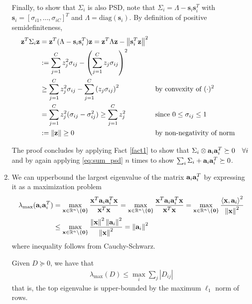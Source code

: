 \documentclass{article}
\begin{document}
\begin{enumerate}[label=1.I.\arabic*]
    Finally, to show that $\Sigma_i$ is also PSD, note that $\Sigma_i = \Lambda - \mathbf{s}_i \mathbf{s}_i^T $ with $\mathbf{s}_i =[\sigma_{i1},\dots, \sigma_{iC}]^T$ and $\Lambda=\text{diag}(\mathbf{s}_i)$. By definition of positive semidefiniteness,
    \begin{align}
        \zz^T \Sigma_i \zz &= \zz^T (\Lambda - \mathbf{s}_i \mathbf{s}_i^T)\zz = \zz^T \Lambda \zz - \norm{\mathbf{s}_i^T \zz}^2 \\
        &:= \sum_{j=1}^{C} z_j^2 \sigma_{ij} - \left(\sum_{j=1}^{C} z_j \sigma_{ij}\right)^2 \\
        &\geq \sum_{j=1}^{C} z_j^2 \sigma_{ij} - \sum_{j=1}^{C} \left( z_j \sigma_{ij}\right)^2 &&\text{by convexity of $(\cdot)^2$}\\
        &= \sum_{j=1}^{C} z_j^2 (\sigma_{ij} - \sigma_{ij}^2) \geq \sum_{j=1}^{C} z_j^2 &&\text{since $0\leq \sigma_{ij} \leq 1$}\\
        &:= \norm{\zz} \geq 0 &&\text{by non-negativity of norm}
    \end{align}
    
    The proof concludes by applying Fact \ref{fact1} to show that $\Sigma_i \otimes \aa_i \aa_i^T \succeq 0 \quad \forall i$ and by again applying \eqref{eq:sum_psd} $n$ times to show $\sum_i \Sigma_i + \aa_i \aa_i^T \succeq 0$.
    \item We can upperbound the largest eigenvalue of the matrix $\aa_i \aa_i^T$ by expressing it as a maximization problem
    \begin{align}
        \lambda_{\max} (\aa_i \aa_i^T) &= \max_{\xx \in \R^n\setminus\{\0\}} \frac{\xx^T \aa_i \aa_i^T \xx}{\xx^T \xx} = \max_{\xx \in \R^n\setminus\{\0\}}\frac{\xx^T \aa_i \aa_i^T \xx}{\xx^T \xx} = \max_{\xx \in \R^n\setminus\{\0\}}\frac{\lin{\xx, \aa_i}^2}{\norm{\xx}^2} \\
        &\leq \max_{\xx \in \R^n\setminus\{\0\}} \frac{\norm{\xx}^2 \norm{\aa_i}^2}{\norm{\xx}^2}  = \norm{\aa_i}^2
    \end{align}
    where inequality follows from Cauchy-Schwarz.
    
    \begin{fact}
        Given $D\succeq 0$, we have that
        \begin{align}
            \lambda_{\max} (D)\leq \max_i \sum_j |D_{ij}|
        \end{align}
        that is, the top eigenvalue is upper-bounded by the maximum $\ell_1$ norm of rows.
        \label{fact2a}
    \end{fact}
    

\end{enumerate}
\end{document}
